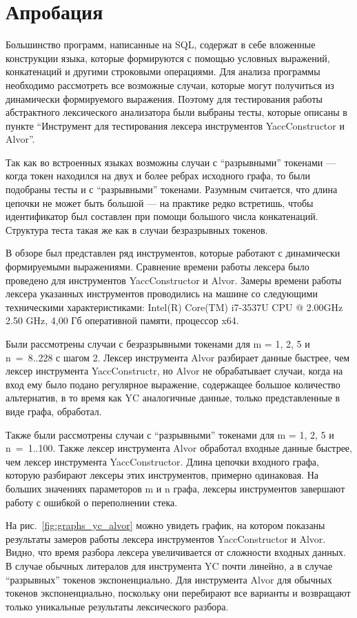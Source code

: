 \section{Апробация}
Большинство  программ, написанные на SQL, содержат в себе вложенные конструкции языка, которые формируются с помощью условных выражений, конкатенаций и другими строковыми операциями. 
Для анализа программы необходимо рассмотреть все возможные случаи, которые могут получиться из динамически формируемого выражения. Поэтому для тестирования работы абстрактного лексического анализатора были выбраны тесты, которые описаны в пункте ``Инструмент для тестирования лексера инструментов YaccConstructor и Alvor''.

Так как во встроенных языках возможны случаи с ``разрывными'' токенами --- когда токен находился на двух и более ребрах исходного графа, то были подобраны тесты и 
с ``разрывными'' токенами. Разумным считается, что длина цепочки не может быть большой --- на практике редко встретишь, чтобы идентификатор был составлен при помощи
большого числа конкатенаций. Структура теста такая же как в случаи безразрывных токенов. 

В обзоре был представлен ряд инструментов, которые работают с динамически формируемыми выражениями. Сравнение времени работы лексера было проведено
для инструментов YaccConstructor и Alvor. Замеры времени работы лексера указанных инструментов проводились на машине со следующими техническими характеристиками:
Intel(R) Core(TM) i7-3537U CPU @ 2.00GHz 2.50 GHz, 4,00 Гб оперативной памяти, процессор x64.

Были рассмотрены случаи с безразрывными токенами для m = 1, 2, 5 и n~=~8..228 с шагом 2. Лексер инструмента Alvor разбирает данные быстрее, чем лексер инструмента YaccConstructr, но Alvor не обрабатывает случаи, когда на вход ему 
было подано регулярное выражение, содержащее большое количество альтернатив, в то  время как YC аналогичные данные, только представленные 
в виде графа,  обработал. 

Также были рассмотрены случаи с ``разрывными'' токенами для m = 1, 2, 5 и n~=~1..100.
Также лексер инструмента Alvor обработал входные данные быстрее, чем лексер инструмента YaccConstructor. Длина цепочки входного графа, которую разбирают лексеры этих инструментов, примерно одинаковая. 
На больших значениях параметоров m и n графа, лексеры инструментов завершают работу с ошибкой о переполнении стека. 

На рис.~\ref{fig:graphs_yc_alvor} можно увидеть график, 
на котором показаны результаты замеров работы лексера инструментов YaccConstructor и Alvor. 
Видно, что время разбора лексера увеличивается от сложности входных данных. В случае обычных литералов для инструмента YC почти линейно, а в случае 
``разрывных'' токенов экспоненциально. Для инструмента Alvor для обычных токенов экспоненциально, поскольку они перебирают все варианты и возвращают 
только уникальные результаты лексического разбора. 

